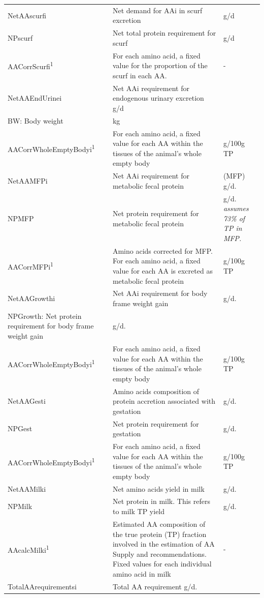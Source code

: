 \begin{refsection}
\begin{longtable}{@{} L{5cm} L{5.5cm} L{2.5cm} @{}}
NetAAscurfi &  Net demand for AAi in scurf excretion  &  g/d \\
NPscurf &  Net total protein requirement for scurf &  g/d\\
AACorrScurfi\textsuperscript{1} &  For each amino acid, a fixed value for the proportion of the scurf in each AA.  &  - \\
NetAAEndUrinei &  Net AAi requirement for endogenous urinary excretion g/d\\
BW: Body weight &  kg\\
AACorrWholeEmptyBodyi\textsuperscript{1} &  For each amino acid, a fixed value for each AA within the tissues of the animal’s whole empty body  &  g/100g TP \\
NetAAMFPi & Net AAi requirement for metabolic fecal protein  & (MFP) g/d.\\
NPMFP &  Net protein requirement for metabolic fecal protein  & g/d. \textit{\small assumes 73\% of TP in MFP.}\\
AACorrMFPi\textsuperscript{1} &  Amino acids corrected for MFP. For each amino acid, a fixed value for each AA is excreted as metabolic fecal protein &  g/100g TP\\
NetAAGrowthi &  Net AAi requirement for body frame weight gain &  g/d.\\
NPGrowth: Net protein requirement for body frame weight gain &  g/d.\\
AACorrWholeEmptyBodyi\textsuperscript{1} &  For each amino acid, a fixed value for each AA within the tissues of the animal’s whole empty body  &  g/100g TP\\
NetAAGesti & Amino acids composition of protein accretion associated with gestation &  g/d.\\
NPGest &  Net protein requirement for gestation &  g/d.\\
AACorrWholeEmptyBodyi\textsuperscript{1} &  For each amino acid, a fixed value for each AA within the tissues of the animal’s whole empty body &  g/100g TP \\
NetAAMilki & Net amino acids yield in milk  & g/d.\\
NPMilk &  Net protein in milk. This refers to milk TP yield  & g/d.\\
AAcalcMilki\textsuperscript{1} &  Estimated AA composition of the true protein (TP) fraction involved in the estimation of AA Supply and recommendations. Fixed values for each individual amino acid in milk  &  -\\
TotalAArequirementsi &  Total AA requirement g/d.\\

\end{longtable}
\end{refsection}
